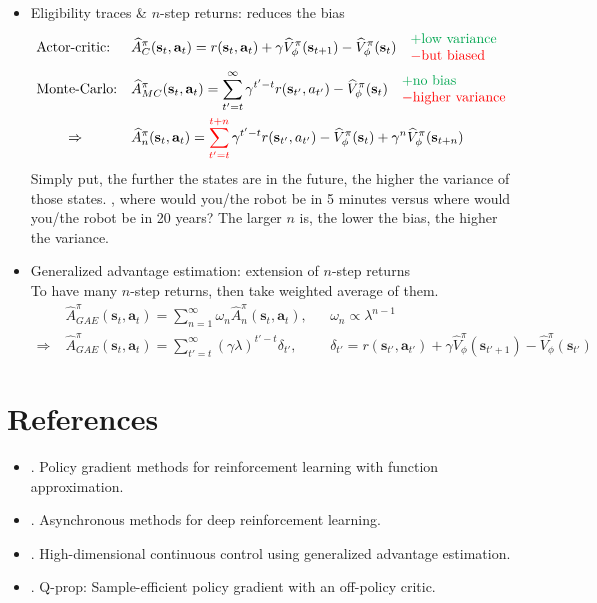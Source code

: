 \begin{itemize}
	\item Eligibility traces \& $n$-step returns: reduces the bias
	\begin{align}
		&\text{Actor-critic:} &&\widehat{A}_C^\pi(\textbf{s}_t, \textbf{a}_t) = r(\textbf{s}_t, \textbf{a}_t) + \gamma \widehat{V}_\phi^\pi(\textbf{s}_{t+1}) - \widehat{V}_\phi^\pi(\textbf{s}_t) \quad \begin{matrix*}[l]
			{\color{Green} + \text{low variance}}\\
			{\color{red} - \text{but biased}}
		\end{matrix*}\\
		&\text{Monte-Carlo:} &&\widehat{A}_{MC}^\pi(\textbf{s}_t, \textbf{a}_t) = \sum_{t' = t}^\infty \gamma^{t'-t} r(\textbf{s}_{t'}, a_{t'}) - \widehat{V}_\phi^\pi(\textbf{s}_t) \quad\begin{matrix*}[l]
			{\color{Green} + \text{no bias}}\\
			{\color{red} - \text{higher variance}}				
		\end{matrix*}\\
		&\qquad\Rightarrow &&\widehat{A}_n^\pi (\textbf{s}_t, \textbf{a}_t) = \sum_{t'=t}^{\color{red} t+n} \gamma^{t'-t} r(\textbf{s}_{t'}, a_{t'}) - \widehat{V}_\phi^\pi(\textbf{s}_t) + \gamma^n \widehat{V}_\phi^\pi(\textbf{s}_{t+n})
	\end{align}
	Simply put, the further the states are in the future, the higher the variance of those states. \Eg, where would you/the robot be in 5 minutes versus where would you/the robot be in 20 years? The larger $n$ is, the lower the bias, the higher the variance.
	\item Generalized advantage estimation: extension of $n$-step returns\\
	To have many $n$-step returns, then take weighted average of them.	
	\begin{align}
		&\widehat{A}_{GAE}^\pi(\textbf{s}_t, \textbf{a}_t) = \sum_{n=1}^\infty \omega_n \widehat{A}_n^\pi(\textbf{s}_t, \textbf{a}_t), && \omega_n \propto \lambda^{n-1}\\
		\Rightarrow\;&\widehat{A}_{GAE}^\pi(\textbf{s}_t, \textbf{a}_t) = \sum_{t'=t}^\infty (\gamma\lambda)^{t'-t} \delta_{t'}, && \delta_{t'} = r(\textbf{s}_{t'}, \textbf{a}_{t'}) + \gamma \widehat{V}^\pi_\phi(\textbf{s}_{t'+1}) - \widehat{V}_\phi^\pi(\textbf{s}_{t'})
	\end{align}
\end{itemize}

\section{References}
\begin{itemize}
	\item {}. Policy gradient methods for reinforcement learning with function approximation.
	\item {}. Asynchronous methods for deep reinforcement learning.
	\item {}. High-dimensional continuous control using generalized advantage estimation.
	\item {}. Q-prop: Sample-efficient policy gradient with an off-policy critic.
\end{itemize}